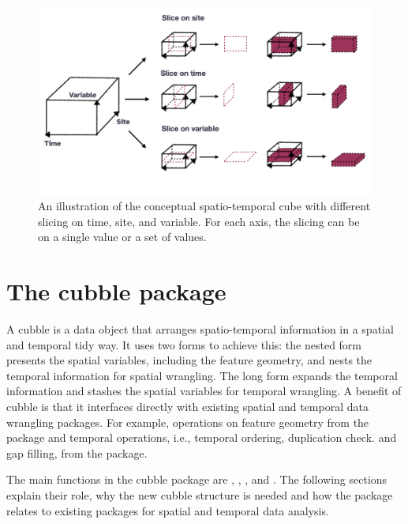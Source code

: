 \documentclass[
]{jss}
\begin{document}
\begin{CodeChunk}
\begin{figure}

{\centering \includegraphics[width=1\linewidth]{../figures/diagram-keynotes/diagram-keynotes.007} 

}

\caption[An illustration of the conceptual spatio-temporal cube with different slicing on time, site, and variable]{An illustration of the conceptual spatio-temporal cube with different slicing on time, site, and variable. For each axis, the slicing can be on a single value or a set of values.}\label{fig:cube-def}
\end{figure}
\end{CodeChunk}

\hypertarget{cubble}{%
\section{The cubble package}\label{cubble}}

A cubble is a data object that arranges spatio-temporal information in a spatial and temporal tidy way. It uses two forms to achieve this: the nested form presents the spatial variables, including the feature geometry, and nests the temporal information for spatial wrangling. The long form expands the temporal information and stashes the spatial variables for temporal wrangling. A benefit of cubble is that it interfaces directly with existing spatial and temporal data wrangling packages. For example, operations on feature geometry from the  package and temporal operations, i.e., temporal ordering, duplication check. and gap filling, from the  package.

The main functions in the cubble package are , , , and . The following sections explain their role, why the new cubble structure is needed and how the package relates to existing packages for spatial and temporal data analysis.
\end{document}
